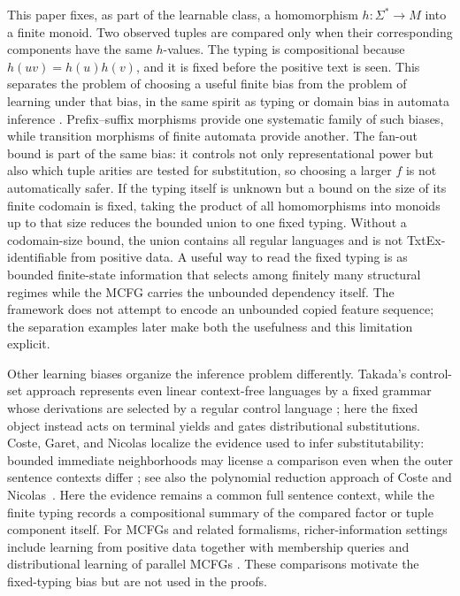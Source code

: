 \documentclass[11pt]{article}
\numberwithin{equation}{section}
\theoremstyle{plain}
\theoremstyle{definition}
\theoremstyle{remark}
\begin{document}
This paper fixes, as part of the learnable class, a homomorphism
$h:\Sigma^*\to M$ into a finite monoid.  Two observed tuples are compared only
when their corresponding components have the same $h$-values.  The typing is
compositional because $h(uv)=h(u)h(v)$, and it is fixed before the positive
text is seen.  This separates the problem of choosing a useful finite bias from
the problem of learning under that bias, in the same spirit as typing or domain
bias in automata inference \cite{CosteTyping2004}.  Prefix--suffix morphisms
provide one systematic family of such biases, while transition morphisms of
finite automata provide another.  The fan-out bound is part of the same bias:
it controls not only representational power but also which tuple arities are
tested for substitution, so choosing a larger $f$ is not automatically safer.
If the typing itself is unknown but a bound on the size of its finite codomain
is fixed, taking the product of all homomorphisms into monoids up to that size
reduces the bounded union to one fixed typing.  Without a
codomain-size bound, the union contains all regular languages and is not
TxtEx-identifiable from positive data.  A useful way to read the fixed typing
is as bounded finite-state information that selects among finitely many
structural regimes while the MCFG carries the unbounded dependency itself.
The framework does not attempt to encode an unbounded copied feature sequence;
the separation examples later make both the usefulness and this limitation
explicit.

Other learning biases organize the inference problem differently.  Takada's
control-set approach represents even linear context-free languages by a fixed grammar whose
derivations are selected by a regular control language
\cite{Takada1988,Takada1995}; here the fixed object instead acts on terminal
yields and gates distributional substitutions.  Coste, Garet, and Nicolas
localize the evidence used to infer substitutability: bounded immediate
neighborhoods may license a comparison even when the outer sentence contexts
differ \cite{CosteGaretNicolas2012}; see also the polynomial reduction
approach of Coste and Nicolas~\cite{CosteNicolas2019}.  Here the evidence remains a common full
sentence context, while the finite typing records a compositional summary of
the compared factor or tuple component itself.  For MCFGs and related
formalisms, richer-information settings include learning from positive data
together with membership queries \cite{Yoshinaka2010} and distributional
learning of parallel MCFGs \cite{ClarkYoshinaka2014}.  These comparisons
motivate the fixed-typing bias but are not used in the proofs.
\end{document}

